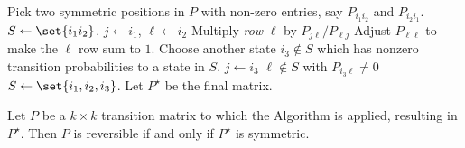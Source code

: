 \documentclass[12pt]{article}
\begin{document}
\begin{algorithm}[H]
  \DontPrintSemicolon
    Pick two symmetric positions in \( P \) with non-zero entries, say
    \( P_{i_1 i_2}
    \) and \( P_{i_2 i_1} \).\;
    \( S \leftarrow \set{i_1  i_2} \).\;
    \( j \leftarrow i_1 \), \( \ell \leftarrow i_2 \)\;
  {
     {Multiply \emph{row} \( \ell \)
      by \( P_{j \ell}/P_{\ell j} \)\;
      Adjust \( P_{\ell \ell} \) to make
      the \( \ell \) row sum to \( 1 \).\;}
    Choose another state \( i_3 \notin S \) which has nonzero transition
    probabilities to a state in \( S \).\;
        \( j \leftarrow i_3 \)  \( \ell \notin S \) with \( P_{i_3
        \ell} \ne 0 \) \;
    \( S \leftarrow \set{i_1, i_2, i_3} \).\;
   }   
  Let \( P^{\star} \) be the final matrix.\;
\end{algorithm}

\begin{theorem}
    Let \( P \) be a \( k \times k \) transition matrix to which the
    Algorithm is applied, resulting in \( P^{\star} \).  Then \( P \) is
    reversible if and only if \( P^{\star} \) is symmetric.
\end{theorem}
\end{document}
